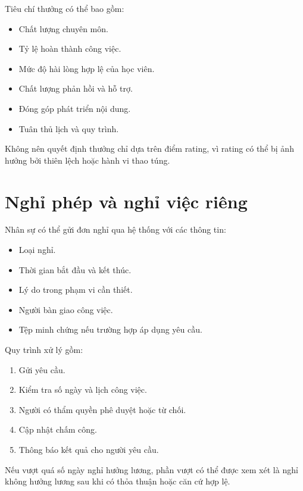 \documentclass[12pt,a4paper]{article}
\begin{document}
Tiêu chí thưởng có thể bao gồm:

\begin{itemize}
    \item Chất lượng chuyên môn.
    \item Tỷ lệ hoàn thành công việc.
    \item Mức độ hài lòng hợp lệ của học viên.
    \item Chất lượng phản hồi và hỗ trợ.
    \item Đóng góp phát triển nội dung.
    \item Tuân thủ lịch và quy trình.
\end{itemize}

Không nên quyết định thưởng chỉ dựa trên điểm rating,
vì rating có thể bị ảnh hưởng bởi thiên lệch hoặc hành vi thao túng.

\section{Nghỉ phép và nghỉ việc riêng}

Nhân sự có thể gửi đơn nghỉ qua hệ thống với các thông tin:

\begin{itemize}
    \item Loại nghỉ.
    \item Thời gian bắt đầu và kết thúc.
    \item Lý do trong phạm vi cần thiết.
    \item Người bàn giao công việc.
    \item Tệp minh chứng nếu trường hợp áp dụng yêu cầu.
\end{itemize}

Quy trình xử lý gồm:

\begin{enumerate}
    \item Gửi yêu cầu.
    \item Kiểm tra số ngày và lịch công việc.
    \item Người có thẩm quyền phê duyệt hoặc từ chối.
    \item Cập nhật chấm công.
    \item Thông báo kết quả cho người yêu cầu.
\end{enumerate}

Nếu vượt quá số ngày nghỉ hưởng lương,
phần vượt có thể được xem xét là nghỉ không hưởng lương
sau khi có thỏa thuận hoặc căn cứ hợp lệ.
\end{document}
